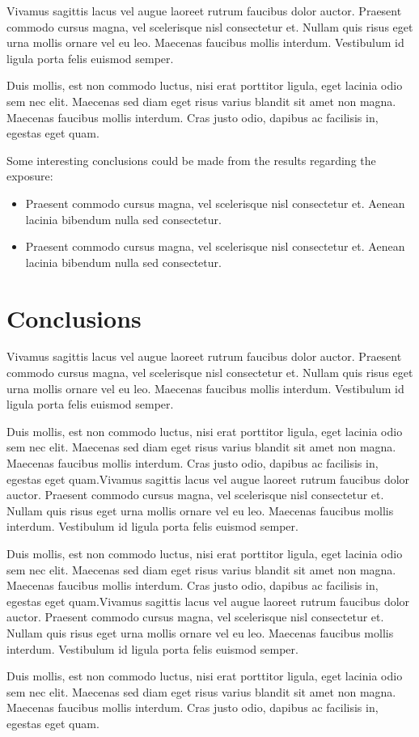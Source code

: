 \documentclass[journal]{../template/IEEEtran}
\begin{document}
Vivamus sagittis lacus vel augue laoreet rutrum faucibus dolor auctor. Praesent commodo cursus magna, vel scelerisque nisl consectetur et. Nullam quis risus eget urna mollis ornare vel eu leo. Maecenas faucibus mollis interdum. Vestibulum id ligula porta felis euismod semper.

Duis mollis, est non commodo luctus, nisi erat porttitor ligula, eget lacinia odio sem nec elit. Maecenas sed diam eget risus varius blandit sit amet non magna. Maecenas faucibus mollis interdum. Cras justo odio, dapibus ac facilisis in, egestas eget quam.

Some interesting conclusions could be made from the results regarding the exposure:
\begin{itemize}
	\item Praesent commodo cursus magna, vel scelerisque nisl consectetur et. Aenean lacinia bibendum nulla sed consectetur.
	\item Praesent commodo cursus magna, vel scelerisque nisl consectetur et. Aenean lacinia bibendum nulla sed consectetur.
\end{itemize}

\section{Conclusions}

Vivamus sagittis lacus vel augue laoreet rutrum faucibus dolor auctor. Praesent commodo cursus magna, vel scelerisque nisl consectetur et. Nullam quis risus eget urna mollis ornare vel eu leo. Maecenas faucibus mollis interdum. Vestibulum id ligula porta felis euismod semper.

Duis mollis, est non commodo luctus, nisi erat porttitor ligula, eget lacinia odio sem nec elit. Maecenas sed diam eget risus varius blandit sit amet non magna. Maecenas faucibus mollis interdum. Cras justo odio, dapibus ac facilisis in, egestas eget quam.Vivamus sagittis lacus vel augue laoreet rutrum faucibus dolor auctor. Praesent commodo cursus magna, vel scelerisque nisl consectetur et. Nullam quis risus eget urna mollis ornare vel eu leo. Maecenas faucibus mollis interdum. Vestibulum id ligula porta felis euismod semper.

Duis mollis, est non commodo luctus, nisi erat porttitor ligula, eget lacinia odio sem nec elit. Maecenas sed diam eget risus varius blandit sit amet non magna. Maecenas faucibus mollis interdum. Cras justo odio, dapibus ac facilisis in, egestas eget quam.Vivamus sagittis lacus vel augue laoreet rutrum faucibus dolor auctor. Praesent commodo cursus magna, vel scelerisque nisl consectetur et. Nullam quis risus eget urna mollis ornare vel eu leo. Maecenas faucibus mollis interdum. Vestibulum id ligula porta felis euismod semper.

Duis mollis, est non commodo luctus, nisi erat porttitor ligula, eget lacinia odio sem nec elit. Maecenas sed diam eget risus varius blandit sit amet non magna. Maecenas faucibus mollis interdum. Cras justo odio, dapibus ac facilisis in, egestas eget quam.




\vfill
\end{document}
